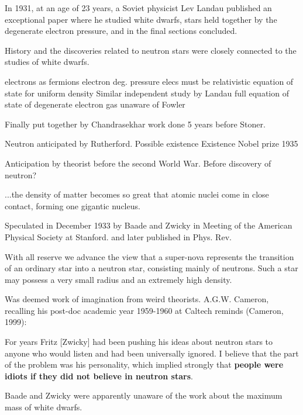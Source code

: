 In 1931, at an age of 23 years, a Soviet physicist Lev Landau published an exceptional paper where he studied white dwarfs, stars held together by the degenerate electron pressure, and in the final sections concluded.


History and the discoveries related to neutron stars were closely connected to the studies of white dwarfs.


electrons as fermions\cite{Dirac25}
electron deg. pressure \cite{Fowler26}
elecs must be relativistic \cite{Anderson29}
equation of state for uniform density \cite{Stoner30}
Similar independent study by Landau \cite{Landau32}
full equation of state of degenerate electron gas unaware of Fowler \cite{Frenkel28} \cite{Yakovlev94}

Finally put together by Chandrasekhar \cite{Cha31} work done 5 years before Stoner.

Neutron anticipated by Rutherford.\cite{Rutherford20}
Possible existence\cite{Chadwick32a}
Existence\cite{Chadwick32b}
Nobel prize 1935

Anticipation by theorist before the second World War. \cite{Landau32}
Before discovery of neutron?
\begin{displayquote}[Landau]
...the density of matter becomes so great that atomic nuclei come in close contact, forming one gigantic nucleus.
\end{displayquote}

Speculated in December 1933 by Baade and Zwicky in Meeting of the American Physical Society at Stanford.\cite{Baade34a}
and later published in Phys. Rev. \cite{Baade34aa}
\begin{displayquote}
With all reserve we advance the view that a super-nova represents the transition of an ordinary star into a neutron star, consisting mainly of neutrons. Such a star may possess a very small radius and an extremely high density.
\end{displayquote}

Was deemed work of imagination from weird theorists.
A.G.W. Cameron, recalling his post-doc academic year 1959-1960 at Caltech reminds (Cameron, 1999): 
\begin{displayquote}
For years Fritz [Zwicky] had been pushing his ideas about neutron stars to anyone who would listen and had been universally ignored. 
I believe that the part of the problem was his personality, which implied strongly that \textbf{people were idiots if they did not believe in neutron stars}.
\end{displayquote}
Baade and Zwicky were apparently unaware of the work about the maximum mass of white dwarfs. 


